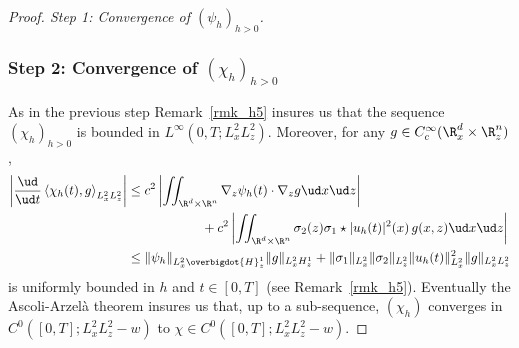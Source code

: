 \begin{proof}[Proof. Step 1: Convergence of $(\psi_{h})_{h>0}$]
\subsubsection*{Step 2: Convergence of $(\chi_{h})_{h>0}$} As in the previous step Remark~\ref{rmk_h5} insures us that the sequence $(\chi_{h})_{h>0}$ is bounded in $L^{\infty}(0,T;L_{x}^{2}L_{z}^{2})$. Moreover, for any $g\in C_{c}^{\infty}(\R_{x}^{d}\times\R_{z}^{n})$,
\begin{align*}
\left|\frac{\ud}{\ud t}\left\langle\chi_{h}(t),g\right\rangle_{L_{x}^{2}L_{z}^{2}}\right|
&\leq c^{2}\left|\iint_{\R^{d}\times\R^{n}}\nabla_{z}\psi_{h}(t)\cdot\nabla_{z}g\ud x\ud z\right|\\
&\hspace*{2cm}+c^{2}\left|\iint_{\R^{d}\times\R^{n}}\sigma_{2}(z)\sigma_{1}\star|u_{h}(t)|^{2}(x)\,g(x,z)\ud x\ud z\right|\\
&\leq\|\psi_{h}\|_{L_{x}^{2}\overbigdot{H}_{z}^{1}}\|g\|_{L_{x}^{2}H_{z}^{1}}+\|\sigma_{1}\|_{L_{x}^{2}}\|\sigma_{2}\|_{L_{z}^{2}}\|u_{h}(t)\|_{L_{x}^{2}}^{2}\|g\|_{L_{x}^{2}L_{z}^{2}}
\end{align*}
is uniformly bounded in $h$ and $t\in[0,T]$ (see Remark~\ref{rmk_h5}). Eventually the Ascoli-Arzelà theorem insures us that, up to a sub-sequence, $(\chi_{h})$ converges in $C^{0}([0,T];L_{x}^{2}L_{z}^{2}-w)$ to $\chi\in C^{0}([0,T];L_{x}^{2}L_{z}^{2}-w)$.


\end{proof}
